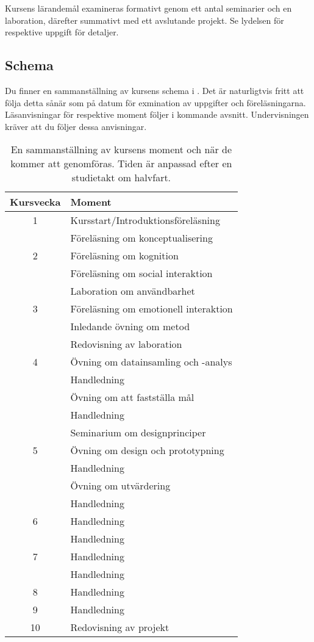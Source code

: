 \documentclass[a4paper,logo]{miunart}
\begin{document}
Kursens lärandemål examineras formativt genom ett antal seminarier och en 
laboration, därefter summativt med ett avslutande projekt.
Se lydelsen för respektive uppgift för detaljer.

\subsection{Schema}

Du finner en sammanställning av kursens schema i .
Det är naturligtvis fritt att följa detta sånär som på datum för exmination av 
uppgifter och föreläsningarna.
Läsanvisningar för respektive moment följer i kommande avsnitt.
Undervisningen kräver att du följer dessa anvisningar.

\begin{table}
  \centering
  \begin{tabular}{cp{10cm}}
    \toprule
    \textbf{Kursvecka} & \textbf{Moment} \\
    \toprule
    1   & Kursstart/Introduktionsföreläsning \\
        & Föreläsning om konceptualisering \\
    \midrule
    2   & Föreläsning om kognition \\
        & Föreläsning om social interaktion \\
        & Laboration om användbarhet \\
    \midrule
    3   & Föreläsning om emotionell interaktion \\
        & Inledande övning om metod \\
        & Redovisning av laboration \\
    \midrule
    4   & Övning om datainsamling och -analys \\
        & Handledning \\
        & Övning om att fastställa mål \\
        & Handledning \\
        & Seminarium om designprinciper \\
    \midrule
    5   & Övning om design och prototypning \\
        & Handledning \\
        & Övning om utvärdering \\
        & Handledning \\
    \midrule
    6   & Handledning \\
        & Handledning \\
    \midrule
    7   & Handledning \\
        & Handledning \\
    \midrule
    8   & Handledning \\
    \midrule
    9   & Handledning \\
    \midrule
    10  & Redovisning av projekt \\
    \bottomrule
  \end{tabular}
  \caption{En sammanställning av kursens moment och när de kommer att 
    genomföras.
    Tiden är anpassad efter en studietakt om halvfart.
  }
  \label{tbl:schema}
\end{table}
\end{document}
